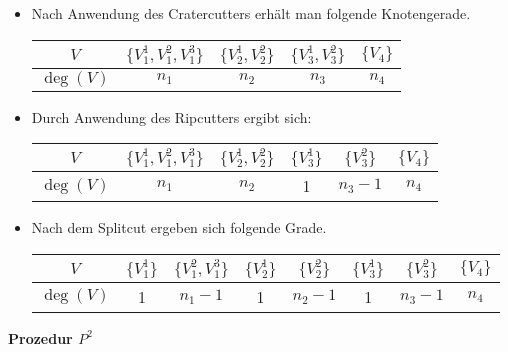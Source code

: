 \documentclass[12pt,titlepage,twoside,cleardoublepage]{article}
\theoremstyle{nummermitklammern}
\numberwithin{equation}{section}
\begin{document}
 \begin{itemize}
 \item Nach Anwendung des Cratercutters erhält man folgende Knotengerade.
 \begin{center}
\begin{tabular}{|c|c|c|c|c|}
\hline
  \textbf{$V$} & $\{V_1^1,V_1^2,V_1^3\}$ & $\{V_2^1,V_2^2\}$& $\{V_3^1,V_3^2\}$& $\{V_4\}$\\ 
  \hline
   \textbf{$\deg(V)$} & $n_1$ & $n_2$ & $n_3$ & $n_4$ \\  
   \hline
 \end{tabular}
 \end{center}

\item %
Durch Anwendung des Ripcutters ergibt sich:
\begin{center}
\begin{tabular}{|c|c|c|c|c|c|}
\hline
  \textbf{$V$} & $\{V_1^1,V_1^2,V_1^3\}$ & $\{V_2^1,V_2^2\}$& $\{V_3^1\}$ & $\{V_3^2\}$& $\{V_4\}$\\ 
  \hline
   \textbf{$\deg(V)$} & $n_1$ & $n_2$ & 1 & $n_3-1$ & $n_4$ \\  
   \hline
 \end{tabular}
 \end{center}
\item %
Nach dem Splitcut ergeben sich folgende Grade.
\begin{center}
\begin{tabular}{|c|c|c|c|c|c|c|c|}
\hline
  \textbf{$V$} & $\{V_1^1\}$ & $\{V_1^2,V_1^3\}$ & $\{V_2^1\}$ & $\{V_2^2\} $ & $\{V_3^1\}$ & $\{V_3^2\}$& $\{V_4\}$\\ 
  \hline
   \textbf{$\deg(V)$} & 1 & $n_1-1$ &1& $n_2-1
   $ & 1 & $n_3-1$ & $n_4$ \\  
   \hline
 \end{tabular}
 \end{center}
 \end{itemize}
\textbf{Prozedur $P^2$}
\end{document}
